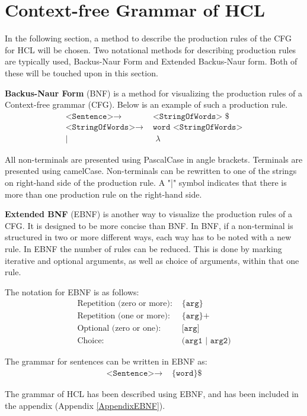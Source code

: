 \section{Context-free Grammar of HCL}
\label{CFGdescription}
In the following section, a method to describe the production rules of the CFG for HCL will be chosen.
Two notational methods for describing production rules are typically used, Backus-Naur Form and Extended Backus-Naur form. 
Both of these will be touched upon in this section.

\textbf{Backus-Naur Form} (BNF) is a method for visualizing the production rules of a Context-free grammar (CFG).
Below is an example of such a production rule.
\begin{align*}
	\texttt{<Sentence>}\to & \texttt{ <StringOfWords> \$}\\
	\texttt{<StringOfWords>}\to & \texttt{ word <StringOfWords>}\\
	| & \texttt{ }\lambda
\end{align*}

All non-terminals are presented using PascalCase in angle brackets.
Terminals are presented using camelCase.
Non-terminals can be rewritten to one of the strings on right-hand side of the production rule.
A "|" symbol indicates that there is more than one production rule on the right-hand side.

\textbf{Extended BNF} (EBNF) is another way to visualize the production rules of a CFG.
It is designed to be more concise than BNF.
In BNF, if a non-terminal is structured in two or more different ways, each way has to be noted with a new rule.
In EBNF the number of rules can be reduced.
This is done by marking iterative and optional arguments, as well as choice of arguments, within that one rule.
\cite{SebestaEBNF}

The notation for EBNF is as follows:
\begin{align*}
	\text{Repetition (zero or more):} & \texttt{ \{arg\}}\\
	\text{Repetition (one or more):} & \texttt{ \{arg\}+}\\
	\text{Optional (zero or one):} & \texttt{ [arg]}\\
	\text{Choice:} & \texttt{ (arg1 | arg2)}
\end{align*}

The grammar for sentences can be written in EBNF as:
\begin{align*}
	\texttt{<Sentence>}\to & \texttt{ \{word\} \$}
\end{align*}

The grammar of HCL has been described using EBNF, and has been included in the appendix (Appendix \ref{AppendixEBNF}).
